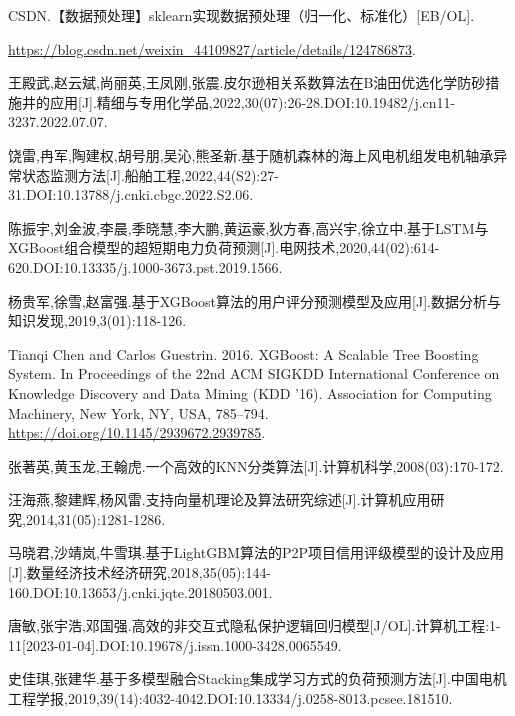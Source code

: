 \documentclass{MathorCupmodeling}
\begin{document}
	\newpage
	\begin{spacing}{1.08}
	\begin{thebibliography}{99}
	CSDN.【数据预处理】sklearn实现数据预处理（归一化、标准化）[EB/OL].
	
	\url{https://blog.csdn.net/weixin_44109827/article/details/124786873}.


	王殿武,赵云斌,尚丽英,王凤刚,张震.皮尔逊相关系数算法在B油田优选化学防砂措施井的应用[J].精细与专用化学品,2022,30(07):26-28.DOI:10.19482/j.cn11-3237.2022.07.07.

	饶雷,冉军,陶建权,胡号朋,吴沁,熊圣新.基于随机森林的海上风电机组发电机轴承异常状态监测方法[J].船舶工程,2022,44(S2):27-31.DOI:10.13788/j.cnki.cbgc.2022.S2.06.

	陈振宇,刘金波,李晨,季晓慧,李大鹏,黄运豪,狄方春,高兴宇,徐立中.基于LSTM与XGBoost组合模型的超短期电力负荷预测[J].电网技术,2020,44(02):614-620.DOI:10.13335/j.1000-3673.pst.2019.1566.

	杨贵军,徐雪,赵富强.基于XGBoost算法的用户评分预测模型及应用[J].数据分析与知识发现,2019,3(01):118-126.

	Tianqi Chen and Carlos Guestrin. 2016. XGBoost: A Scalable Tree Boosting System. In Proceedings of the 22nd ACM SIGKDD International Conference on Knowledge Discovery and Data Mining (KDD '16). Association for Computing Machinery, New York, NY, USA, 785–794. \url{https://doi.org/10.1145/2939672.2939785}.

	张著英,黄玉龙,王翰虎.一个高效的KNN分类算法[J].计算机科学,2008(03):170-172.

	汪海燕,黎建辉,杨风雷.支持向量机理论及算法研究综述[J].计算机应用研究,2014,31(05):1281-1286.

	马晓君,沙靖岚,牛雪琪.基于LightGBM算法的P2P项目信用评级模型的设计及应用[J].数量经济技术经济研究,2018,35(05):144-160.DOI:10.13653/j.cnki.jqte.20180503.001.

	唐敏,张宇浩,邓国强.高效的非交互式隐私保护逻辑回归模型[J/OL].计算机工程:1-11[2023-01-04].DOI:10.19678/j.issn.1000-3428.0065549.

	史佳琪,张建华.基于多模型融合Stacking集成学习方式的负荷预测方法[J].中国电机工程学报,2019,39(14):4032-4042.DOI:10.13334/j.0258-8013.pcsee.181510.

	\end{thebibliography}
	\end{spacing}
	\newpage
\end{document}
